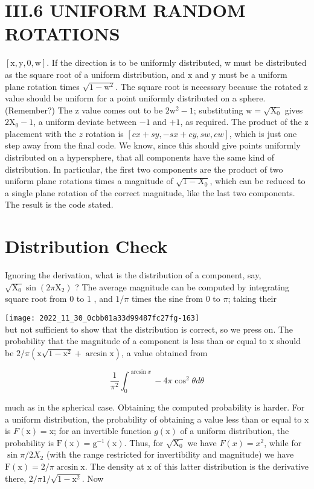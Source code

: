 \section{III.6 UNIFORM RANDOM ROTATIONS}
$[\mathrm{x}, \mathrm{y}, 0, \mathrm{w}]$. If the direction is to be uniformly distributed, w must be distributed as the square root of a uniform distribution, and $\mathrm{x}$ and $\mathrm{y}$ must be a uniform plane rotation times $\sqrt{1-\mathrm{w}^{2}}$. The square root is necessary because the rotated $\mathrm{z}$ value should be uniform for a point uniformly distributed on a sphere. (Remember?) The $\mathrm{z}$ value comes out to be $2 \mathrm{w}^{2}-1$; substituting $\mathrm{w}=\sqrt{\mathrm{X}_{0}}$ gives $2 \mathrm{X}_{0}-1$, a uniform deviate between $-1$ and $+1$, as required. The product of the $\mathrm{z}$ placement with the $z$ rotation is $[c x+s y,-s x+c y, s w, c w]$, which is just one step away from the final code. We know, since this should give points uniformly distributed on a hypersphere, that all components have the same kind of distribution. In particular, the first two components are the product of two uniform plane rotations times a magnitude of $\sqrt{1-X_{0}}$, which can be reduced to a single plane rotation of the correct magnitude, like the last two components. The result is the code stated.

\section{Distribution Check}
Ignoring the derivation, what is the distribution of a component, say, $\sqrt{\mathrm{X}_{0}} \sin \left(2 \pi \mathrm{X}_{2}\right)$ ? The average magnitude can be computed by integrating square root from 0 to 1 , and $1 / \pi$ times the sine from 0 to $\pi$; taking their

\texttt{[image: 2022\_11\_30\_0cbb01a33d99487fc27fg-163]}\\
but not sufficient to show that the distribution is correct, so we press on. The probability that the magnitude of a component is less than or equal to $\mathrm{x}$ should be $2 / \pi\left(\mathrm{x} \sqrt{1-\mathrm{x}^{2}}+\arcsin \mathrm{x}\right)$, a value obtained from

$$
\frac{1}{\pi^{2}} \int_{0}^{\arcsin x}-4 \pi \cos ^{2} \theta d \theta
$$

much as in the spherical case. Obtaining the computed probability is harder. For a uniform distribution, the probability of obtaining a value less than or equal to $\mathrm{x}$ is $F(\mathrm{x})=\mathrm{x}$; for an invertible function $g(\mathrm{x})$ of a uniform distribution, the probability is $\mathrm{F}(\mathrm{x})=\mathrm{g}^{-1}(\mathrm{x})$. Thus, for $\sqrt{\mathrm{X}_{0}}$ we have $F(x)=x^{2}$, while for $\sin \pi / 2 X_{2}$ (with the range restricted for invertibility and magnitude) we have $\mathrm{F}(\mathrm{x})=2 / \pi \arcsin \mathrm{x}$. The density at $\mathrm{x}$ of this latter distribution is the derivative there, $2 / \pi 1 / \sqrt{1-\mathrm{x}^{2}}$. Now

